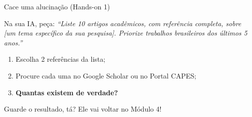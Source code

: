 \documentclass[11pt,aspectratio=169,t]{beamer}
\begin{document}
\begin{frame}{Cace uma alucinação (Hands-on 1)}
  \begin{exampleblock}{Na sua IA, peça:}
    \textit{``Liste 10 artigos acadêmicos, com referência completa, sobre [um tema específico da sua pesquisa]. Priorize trabalhos brasileiros dos últimos 5 anos.''}
  \end{exampleblock}
  \vfill
  \begin{enumerate}
    \item Escolha 2 referências da lista;
    \item Procure cada uma no Google Scholar ou no Portal CAPES;
    \item \textbf{Quantas existem de verdade?}
  \end{enumerate}
  \vfill
  \begin{block}{}
    \centering Guarde o resultado, tá? Ele vai voltar no Módulo 4!
  \end{block}
\end{frame}
\end{document}
